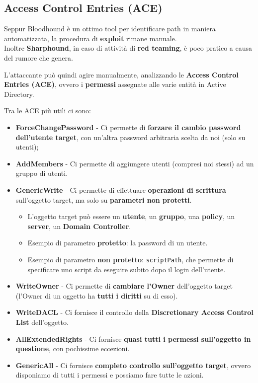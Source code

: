 \documentclass{article}
\begin{document}
\subsection{Access Control Entries (ACE)}
Seppur Bloodhound è un ottimo tool per identificare path in maniera automatizzata, la procedura di \textbf{exploit} rimane manuale.\\
Inoltre \textbf{Sharphound}, in caso di attività di \textbf{red teaming}, è poco pratico a causa del rumore che genera.

L'attaccante può quindi agire manualmente, analizzando le \textbf{Access Control Entries (ACE)}, ovvero i \textbf{permessi} assegnate alle varie entità in Active Directory.

Tra le ACE più utili ci sono:
\begin{itemize}
	\item \textbf{ForceChangePassword} - Ci permette di \textbf{forzare il cambio password dell’utente target}, con un’altra password arbitraria scelta da noi (solo su utenti);
	
	\item \textbf{AddMembers} - Ci permette di aggiungere utenti (compresi noi stessi) ad un gruppo di utenti.
	
	\item \textbf{GenericWrite} - Ci permette di effettuare
	\textbf{operazioni di scrittura} sull’oggetto target, ma solo su \textbf{parametri non protetti}.
	\begin{itemize}
		\item L'oggetto target può essere un \textbf{utente}, un \textbf{gruppo}, una \textbf{policy}, un \textbf{server}, un \textbf{Domain Controller}.
		
		\item Esempio di parametro \textbf{protetto}: la password di un utente.
		\item Esempio di parametro \textbf{non protetto}: \verb|scriptPath|, che permette di specificare uno script da eseguire subito dopo il login dell’utente.
	\end{itemize}
	
	\item \textbf{WriteOwner} - Ci permette di \textbf{cambiare l’Owner} dell’oggetto target (l’Owner di un oggetto ha \textbf{tutti i diritti} su di esso).
	
	\item \textbf{WriteDACL} - Ci fornisce il controllo della \textbf{Discretionary Access Control List} dell'oggetto.
	
	\item \textbf{AllExtendedRights} - Ci fornisce \textbf{quasi tutti i permessi sull’oggetto in questione}, con pochissime eccezioni.
	
	\item \textbf{GenericAll} -  Ci fornisce \textbf{completo controllo sull'oggetto target}, ovvero disponiamo di tutti i permessi e possiamo fare tutte le azioni.
\end{itemize}
\end{document}
